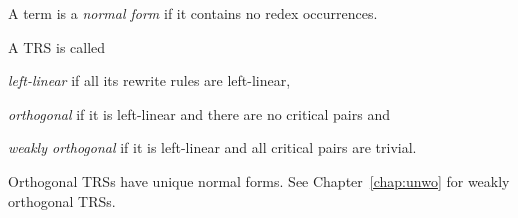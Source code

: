 A term is a \emph{normal form} if it contains no redex occurrences.



\begin{definition}%
A TRS is called
\begin{compactenum}
  \item \emph{left-linear} if all its rewrite rules are left-linear,
  \item \emph{orthogonal} if it is left-linear and there are no critical pairs and
  \item \emph{weakly orthogonal} if it is left-linear and all critical pairs
    are trivial.
\end{compactenum}
\end{definition}

Orthogonal TRSs have unique normal forms. See Chapter~\ref{chap:unwo} for
weakly orthogonal TRSs.
